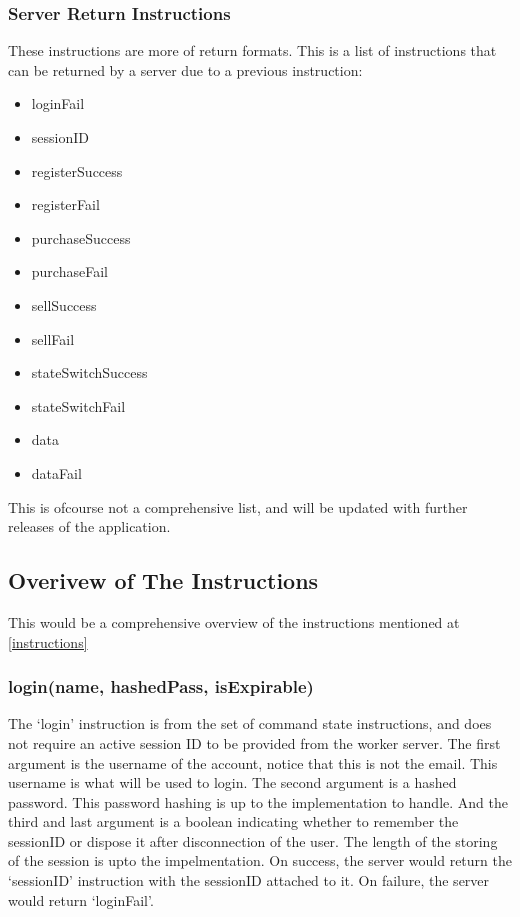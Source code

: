 \documentclass[a4paper]{article}
\begin{document}
\subsubsection{Server Return Instructions}
These instructions are more of return formats. This is a list of instructions 
that can be returned by a server due to a previous instruction:
\begin{itemize}
	\item loginFail
	\item sessionID
	\item registerSuccess
	\item registerFail
	\item purchaseSuccess
	\item purchaseFail
	\item sellSuccess
	\item sellFail
	\item stateSwitchSuccess
	\item stateSwitchFail
	\item data
	\item dataFail
\end{itemize}

This is ofcourse not a comprehensive list, and will be updated with further
releases of the application.

\subsection{Overivew of The Instructions}
This would be a comprehensive overview of the instructions mentioned at
\ref{instructions} 

\subsubsection{login(name, hashedPass, isExpirable)}
The `login' instruction is from the set of command state instructions, and does
not require an active session ID to be provided from the worker server. The
first argument is the username of the account, notice that this is not the
email. This username is what will be used to login. The second argument is a
hashed password. This password hashing is up to the implementation to handle.
And the third and last argument is a boolean indicating whether to remember the
sessionID or dispose it after disconnection of the user. The length of the
storing of the session is upto the impelmentation. On success, the server would
return the `sessionID' instruction with the sessionID attached to it. On 
failure, the server would return `loginFail'.
\end{document}
